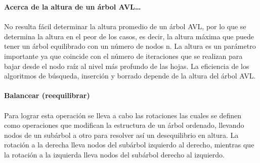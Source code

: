 \documentclass{report}
\begin{document}
\textbf{Acerca de la altura de un árbol AVL…}\\\\
No resulta fácil determinar la altura promedio de un árbol AVL, por lo que se determina la altura en el peor de los casos, es decir, la altura máxima que puede tener un árbol equilibrado con un número de nodos n. La altura es un parámetro importante ya que coincide con el número de iteraciones que se realizan para bajar desde el nodo raíz al nivel más profundo de las hojas. La eficiencia de los algoritmos de búsqueda, inserción y borrado depende de la altura del árbol AVL.\\\\
\textbf{Balancear (reequilibrar)}\\\\
Para lograr esta operación se lleva a cabo las rotaciones las cuales se definen como operaciones que modifican la estructura de un árbol ordenado, llevando nodos de un subárbol a otro para resolver así un desequilibrio en altura.
La rotación a la derecha lleva nodos del subárbol izquierdo al derecho, mientras que la rotación a la izquierda lleva nodos del subárbol derecho al izquierdo.
\end{document}
